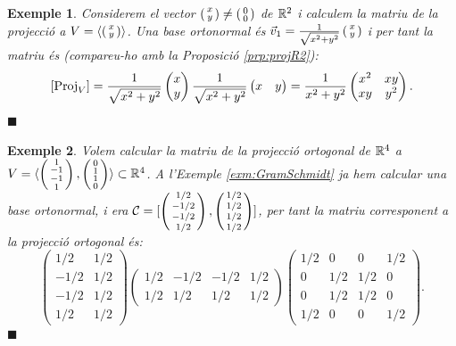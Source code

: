 \documentclass[
  11pt,
]{book}
\numberwithin{dummy}{section}
\theoremstyle{maincolornumbox}
\theoremstyle{blacknumex}
\newtheorem{exampleT}{Exemple}[chapter]
\theoremstyle{blacknumbox}
\theoremstyle{maincolornum}
\newenvironment{example}{\begin{exampleT}}{\hfill{\tiny\ensuremath{\blacksquare}}\end{exampleT}}
\newlength\esp
\begin{document}
\begin{example}
Considerem el vector \(\left(\begin{smallmatrix}x\\y\end{smallmatrix}\right)\neq\left(\begin{smallmatrix}0\\0\end{smallmatrix}\right)\) de \(\mathbb{R}^2\) i calculem
la matriu de la projecció a \(V=\langle \left(\begin{smallmatrix}x\\y\end{smallmatrix}\right)\rangle\). Una base
ortonormal és \(\vec v_1=\frac{1}{\sqrt{x^2+y^2}}\left(\begin{smallmatrix}x\\y\end{smallmatrix}\right)\) i per tant
la matriu és (compareu-ho amb la Proposició
\ref{prp:projR2}):
\[[\operatorname{Proj}_V]=\frac{1}{\sqrt{x^2+y^2}} \begin{pmatrix} x \\ y \end{pmatrix} \frac{1}{\sqrt{x^2+y^2}} \begin{pmatrix} x & y \end{pmatrix} = \frac{1}{x^2+y^2} \begin{pmatrix} x^2 & xy \\ xy & y^2 \end{pmatrix} .\]
\end{example}

\begin{example}
Volem calcular la matriu de la projecció ortogonal de \(\mathbb{R}^4\) a
\(V=\langle \left(\begin{smallmatrix}1\\-1\\-1\\1\end{smallmatrix}\right), \left(\begin{smallmatrix}0\\1\\1\\0\end{smallmatrix}\right)\rangle \subset \mathbb{R}^4\).
A l'Exemple
\ref{exm:GramSchmidt} ja hem calcular una base ortonormal, i
era \(\mathcal{C}=[\left(\begin{smallmatrix}1/2\\-1/2\\-1/2\\1/2\end{smallmatrix}\right),\left(\begin{smallmatrix}1/2\\1/2\\1/2\\1/2\end{smallmatrix}\right)]\), per
tant la matriu corresponent a la projecció ortogonal és:
\[\begin{pmatrix}
1/2 & 1/2 \\ -1/2 & 1/2 \\ -1/2 & 1/2 \\ 1/2 & 1/2
\end{pmatrix}
\begin{pmatrix}
1/2 & -1/2 & -1/2 & 1/2 \\ 1/2 & 1/2 & 1/2 & 1/2 
\end{pmatrix}
\begin{pmatrix}
1/2 & 0 & 0 & 1/2 \\
0 & 1/2 & 1/2 & 0 \\
0 & 1/2 & 1/2 & 0 \\
1/2 & 0 & 0 & 1/2
\end{pmatrix}.\]
\end{example}
\end{document}

